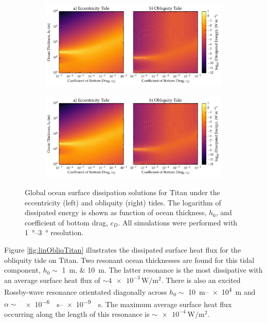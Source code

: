 \begin{figure}[!t]
    \centering
    \begin{subfigure}[t]{0.85\linewidth} %
        \includegraphics[width=\linewidth]{Figures/titan_bottom}
        \label{fig:botEccTitan}
    \end{subfigure}
    \begin{subfigure}[t]{0\linewidth} %
         \includegraphics[width=\linewidth]{Figures/titan_bottom}
         \label{fig:botObliqTitan}   
    \end{subfigure}
    \vspace{-0.5cm}
\caption{Global ocean surface dissipation solutions for Titan under the eccentricity (left) and obliquity (right) tides. The logarithm of dissipated energy is shown as function of ocean thickness, $h_0$, and coefficient of bottom drag, $c_D$. All simulations were performed with \SIrange{1}{3}{\degree} resolution. \label{fig:botTitan}}
\end{figure}


Figure \ref{fig:linObliqTitan} illustrates the dissipated surface heat flux for the obliquity tide on Titan. Two resonant ocean thicknesses are found for this tidal component, $h_0 \sim$ \SIlist{1;10}{\metre}. The latter resonance is the most dissipative with an average surface heat flux of $\sim \num{4e-3}\, \si{\watt\per\square\metre}$. There is also an excited Rossby-wave resonance orientated diagonally across $h_0 \sim$ \SIrange{10}{e4}{\metre} and \hbox{$\alpha \sim$ \SIrange{e-6}{e-9}{\per\second}}. The maximum average surface heat flux occurring along the length of this resonance is $\sim \SI{e-4}{\watt\per\square\metre}$. 

